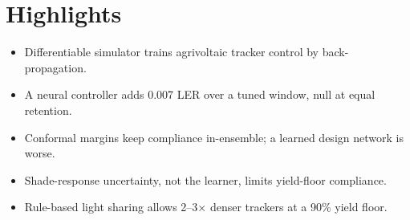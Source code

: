 \documentclass[11pt]{article}
\begin{document}
\section*{Highlights}
\begin{itemize}[leftmargin=1.5em,itemsep=0.6em]
\item Differentiable simulator trains agrivoltaic tracker control by back-propagation.
\item A neural controller adds 0.007 LER over a tuned window, null at equal retention.
\item Conformal margins keep compliance in-ensemble; a learned design network is worse.
\item Shade-response uncertainty, not the learner, limits yield-floor compliance.
\item Rule-based light sharing allows 2--3$\times$ denser trackers at a 90\% yield floor.
\end{itemize}
\end{document}

